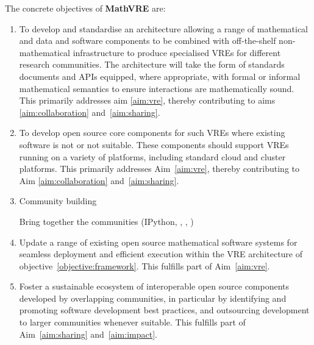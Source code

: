 \documentclass[a4paper,11pt]{article}
\newcommand{\XX}{\textbf{MathVRE}\xspace}
\newcommand{\TheProject}{\XX}
\begin{document}
The concrete objectives of \TheProject are:
\begin{enumerate}
\item\label{objective:framework} To develop and standardise
  an architecture allowing a range of mathematical and
  data and software components to be combined 
  with off-the-shelf non-mathematical infrastructure to produce
  specialised VREs for different research communities. The
  architecture will take the form of standards documents and APIs
  equipped, where appropriate, with formal or informal mathematical
  semantics to ensure interactions are mathematically sound. This primarily
  addresses aim \ref{aim:vre}, thereby contributing to aims
  \ref{aim:collaboration} and~\ref{aim:sharing}. 

\item\label{objectives:core} To develop open source core components
  for such VREs where existing software is not  or not suitable. These
  components should support VREs running on a variety of
  platforms, including standard cloud and cluster platforms. This primarily
  addresses Aim~\ref{aim:vre}, thereby contributing to Aim
  \ref{aim:collaboration} and~\ref{aim:sharing}.
  




\item \label{objective:community}Community building

  Bring together the communities (IPython, \Sage, \Singular, \GAP)


\item \label{objective:updates} Update a range of existing open source
  mathematical software systems for seamless deployment and efficient
  execution within the VRE architecture of objective~\ref{objective:framework}.
  This fulfills part of Aim~\ref{aim:vre}.



\item \label{objective:sustainable} Foster a sustainable ecosystem of
  interoperable open source components developed by overlapping
  communities, in particular by identifying and promoting software
  development best practices, and outsourcing development to larger
  communities whenever suitable. This fulfills part of
  Aim~\ref{aim:sharing} and~\ref{aim:impact}.



\end{enumerate}
\end{document}

